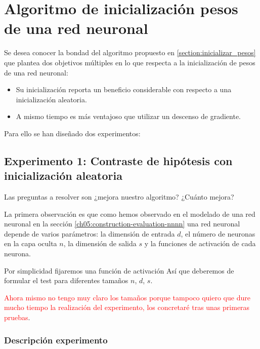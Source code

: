 
\chapter{Algoritmo de inicialización pesos de una red neuronal}  

Se desea conocer la bondad del algoritmo propuesto 
en \ref{section:inicializar_pesos} que plantea dos objetivos múltiples en lo que respecta a la inicialización de pesos de una red neuronal:

\begin{itemize}
    \item Su inicialización reporta un beneficio considerable con respecto a una inicialización aleatoria. 
    \item A mismo tiempo es más ventajoso que utilizar un descenso de gradiente. 
\end{itemize}

Para ello se han diseñado dos experimentos: 
 
\section{Experimento 1: Contraste de hipótesis con inicialización aleatoria} 
\label{ch07:experimento-1} 

Las preguntas a resolver son ¿mejora nuestro algoritmo? ¿Cuánto mejora?

La primera observación  es que como
hemos observado en el modelado de una red neuronal 
en la sección \ref{ch05:construction-evaluation-nnnn}
una red neuronal depende de varios parámetros:
la dimensión de entrada $d$, el número de neuronas en la capa oculta $n$, la dimensión de salida $s$ 
y la funciones de activación de cada neurona.  

Por simplicidad fijaremos una función de activación 
Así que deberemos de formular el test 
para diferentes tamaños $n$, $d$, $s$. 

\textcolor{red}{Ahora mismo no tengo muy claro 
los tamaños porque tampoco quiero que dure mucho tiempo la realización del experimento, los concretaré tras unas primeras pruebas}. 

\subsection{Descripción experimento}


